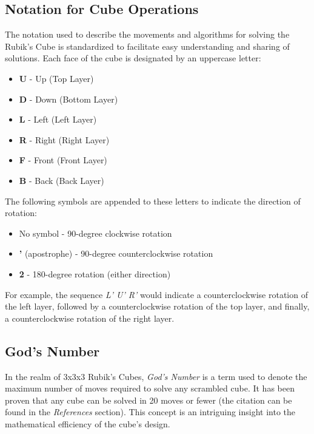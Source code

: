 \documentclass[12pt]{article}
\begin{document}
\subsection{Notation for Cube Operations}

The notation used to describe the movements and algorithms for solving the Rubik's Cube is standardized to facilitate easy understanding and sharing of solutions. Each face of the cube is designated by an uppercase letter:

\begin{itemize}
    \item \textbf{U} - Up (Top Layer)
    \item \textbf{D} - Down (Bottom Layer)
    \item \textbf{L} - Left (Left Layer)
    \item \textbf{R} - Right (Right Layer)
    \item \textbf{F} - Front (Front Layer)
    \item \textbf{B} - Back (Back Layer)
\end{itemize}

The following symbols are appended to these letters to indicate the direction of rotation:

\begin{itemize}
    \item No symbol - 90-degree clockwise rotation
    \item \textbf{'} (apostrophe) - 90-degree counterclockwise rotation
    \item \textbf{2} - 180-degree rotation (either direction)
\end{itemize}

For example, the sequence \textit{L' U' R'} would indicate a counterclockwise rotation of the left layer, followed by a counterclockwise rotation of the top layer, and finally, a counterclockwise rotation of the right layer.

\subsection{God's Number}
In the realm of 3x3x3 Rubik's Cubes, \textit{God's Number} is a term used to denote the maximum number of moves required to solve any scrambled cube. It has been proven that any cube can be solved in 20 moves or fewer (the citation can be found in the \textit{References} section). This concept is an intriguing insight into the mathematical efficiency of the cube's design.
\end{document}
